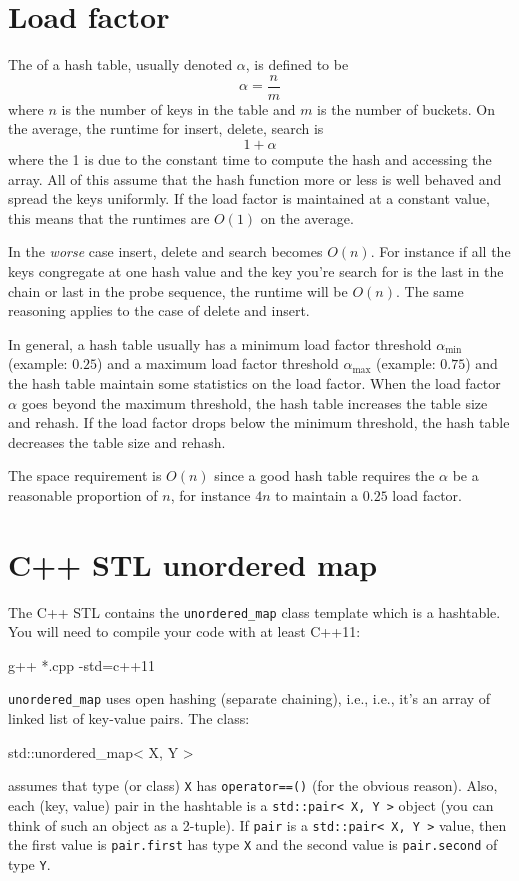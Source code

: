 \newpage
\section{Load factor}

The  of a hash table, usually denoted $\alpha$, 
is defined to be
\[
\alpha = \frac{n}{m}
\]
where $n$ is the number of keys in the table and $m$ is the number of buckets.
On the average, the runtime for insert, delete, search is
\[
1 + \alpha
\]
where the 1 is due to the constant time to compute the hash and accessing the array.
All of this assume that the hash function more or less is well behaved and spread
the keys uniformly.
If the load factor is maintained at a constant value, this means
that the runtimes are $O(1)$ on the average.

In the \textit{worse} case 
insert, delete and search becomes $O(n)$.
For instance if all the keys congregate at one hash value and the 
key you're search for is the last in the chain or last in the probe sequence,
the runtime will be $O(n)$.
The same reasoning applies to the case of delete and insert.

In general, a hash table usually has a minimum load factor threshold
$\alpha_{\operatorname{min}}$ (example: $0.25$)
and a maximum load factor threshold
$\alpha_{\operatorname{max}}$ (example: $0.75$)
and the hash table maintain some statistics on the load factor.
When the load factor $\alpha$ goes beyond the maximum threshold, 
the hash table increases the table size and rehash.
If the load factor drops below the minimum threshold, the hash table
decreases the table size and rehash.

The space requirement is $O(n)$ since 
a good hash table requires the $\alpha$ be a reasonable
proportion of $n$, for instance $4n$ to maintain a $0.25$ load factor.



\newpage
\section{C++ STL unordered map}

The C++ STL contains the \verb!unordered_map! class template
which is a hashtable.
You will need to compile your code with at least C++11:
\begin{console}
g++ *.cpp -std=c++11
\end{console}
\verb!unordered_map! uses open hashing (separate chaining), i.e., 
i.e., it's an array of linked list of key-value pairs.
The class:
\begin{console}
std::unordered_map< X, Y >
\end{console}
assumes that type (or class) \verb!X! has
\verb!operator==()!
(for the obvious reason).
Also, each (key, value) pair in the hashtable
is a \verb!std::pair< X, Y >! object
(you can think of such an object as a 2-tuple).
If \verb!pair! is a
\verb!std::pair< X, Y >! value,
then the first value is \verb!pair.first! has type \verb!X!
and the second value is \verb!pair.second! of type \verb!Y!.

